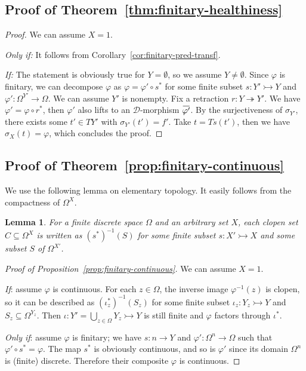 \documentclass[9pt, preprint]{sigplanconf}
\theoremstyle{theorem}
\newtheorem{lemma}[theorem]{Lemma}
\theoremstyle{definition}
\newcommand{\cat}[1]{\mathcal{#1}}
\renewcommand{\bar}{\overbar}
\newcommand{\overbar}[1]{\mkern 1.5mu\overline{\mkern-1.5mu#1\mkern-1.5mu}\mkern 1.5mu}
\renewcommand{\phi}{\varphi}
\newcommand{\into}{\rightarrowtail}
\newcommand{\onto}{\twoheadrightarrow}
\renewcommand{\subset}{\subseteq}
\newcommand{\after}{\mathrel{\circ}}
\begin{document}
\subsection{Proof of Theorem~\ref{thm:finitary-healthiness}}
\begin{proof}
  We can assume $X = 1$.

  \emph{Only if:} It follows from Corollary~\ref{cor:finitary-pred-transf}.

  \emph{If:} The statement is obviously true for $Y = \emptyset$,
  so we assume $Y \neq \emptyset$.
  Since $\phi$ is finitary, we can decompose $\phi$
  as $\phi = \phi' \after s^*$ for some finite subset $s \colon Y' \into Y$
  and $\phi' \colon \Omega^{Y'} \to \Omega$.
  We can assume $Y'$ is nonempty.
  Fix a retraction $r \colon Y \onto Y'$.
  We have $\phi' = \phi \after r^*$, then $\phi'$ also lifts
  to an $\cat{D}$-morphism $\bar{\phi'}$.
  By the surjectiveness of $\sigma_{Y'}$, there exists
  some $t' \in T{Y'}$ with $\sigma_{Y'}(t') = f'$.
  Take $t = Ts(t')$, then we have $\sigma_X(t) = \phi$,
  which concludes the proof.
\end{proof}


\subsection{Proof of Theorem~\ref{prop:finitary-continuous}}

We use the following lemma on elementary topology.
It easily follows from the compactness of $\Omega^X$.

\begin{lemma}
  For a finite discrete space $\Omega$ and an arbitrary set $X$,
  each clopen set $C \subset \Omega^{X}$ is written as
  $(s^{*})^{-1}(S)$ for some finite subset $s \colon X' \into X$
  and some subset $S$ of $\Omega^{X'}$.
\end{lemma}

\begin{proof}[Proof of Proposition~\ref{prop:finitary-continuous}]
  We can assume $X = 1$.

  \emph{If}: assume $\phi$ is continuous. For each $z \in \Omega$,
  the inverse image $\phi^{-1}(z)$ is clopen, so it can be described as
  $(\iota_z^*)^{-1}(S_z)$ for some
  finite subset $\iota_z \colon Y_z \into Y$ and $S_z \subset \Omega^{Y_z}$.
  Then $\iota \colon Y' = \bigcup_{z \in \Omega} Y_z \into Y$ is still finite
  and $\phi$ factors through $\iota^*$.

  \emph{Only if}: assume $\phi$ is finitary;
  we have $s \colon n \to Y$ and $\phi' \colon \Omega^n \to \Omega$
  such that $\phi' \circ s^* = \phi$.
  The map $s^*$ is obviously continuous, and
  so is $\phi'$ since its domain $\Omega^n$ is (finite) discrete.
  Therefore their composite $\phi$ is continuous.
\end{proof}
\end{document}
